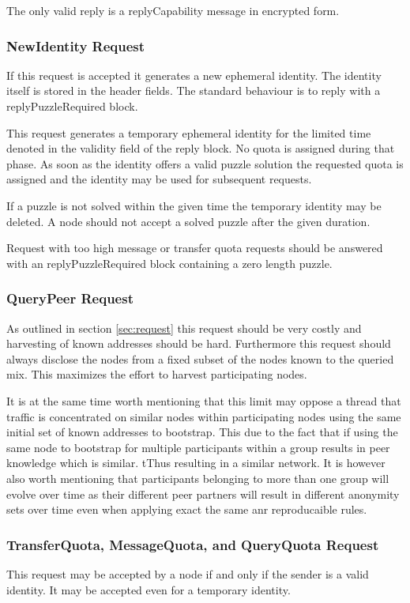 The only valid reply is a replyCapability message in encrypted form.

\subsubsection{NewIdentity Request}
If this request is accepted it generates a new ephemeral identity. The identity itself is stored in the header fields. The standard behaviour is to reply with a replyPuzzleRequired block. 

This request generates a temporary ephemeral identity for the limited time denoted in the validity field of the reply block. No quota is assigned during that phase. As soon as the identity offers a valid puzzle solution the requested quota is assigned and the identity may be used for subsequent requests.

If a puzzle is not solved within the given time the temporary identity may be deleted. A node should not accept a solved puzzle after the given duration. 

Request with too high message or transfer quota requests should be answered with an replyPuzzleRequired block containing a zero length puzzle.

\subsubsection{QueryPeer Request}
As outlined in section \ref{sec:request} this request should be very costly and harvesting of known addresses should be hard. Furthermore this request should always  disclose the nodes from a fixed subset of the nodes known to the queried mix. This maximizes the effort to harvest participating nodes.

It is at the same time worth mentioning that this limit may oppose a thread that traffic is concentrated on similar nodes within participating nodes using the same initial set of known addresses to bootstrap. This due to the fact that if using the same node to bootstrap for multiple participants within a group results in peer knowledge which is similar. tThus resulting in a similar network. It is however also worth mentioning that participants belonging to more than one group will evolve over time as their different peer partners will result in different anonymity sets over time even when applying exact the same anr reproducaible rules.


\subsubsection{TransferQuota, MessageQuota,  and QueryQuota Request}
This request may be accepted by a node if and only if the sender is a valid identity. It may be accepted even for a temporary identity.

